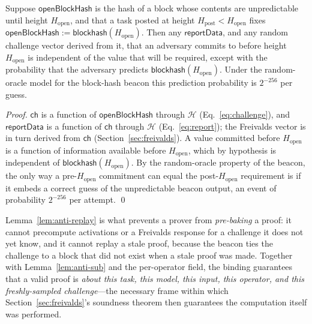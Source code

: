 \begin{lemma}
\label{lem:anti-replay}
Suppose $\mathsf{openBlockHash}$ is the hash of a block whose contents are
unpredictable until height $H_{\mathrm{open}}$, and that a task posted at height
$H_{\mathrm{post}} < H_{\mathrm{open}}$ fixes $\mathsf{openBlockHash} :=
\mathsf{blockhash}(H_{\mathrm{open}})$. Then any $\mathsf{reportData}$, and any
random challenge vector derived from it, that an adversary commits to before height
$H_{\mathrm{open}}$ is independent of the value that will be required, except with
the probability that the adversary predicts $\mathsf{blockhash}(H_{\mathrm{open}})$.
Under the random-oracle model for the block-hash beacon this prediction probability
is $2^{-256}$ per guess.
\end{lemma}

\begin{proof}
$\mathsf{ch}$ is a function of $\mathsf{openBlockHash}$ through $\mathcal{H}$
(Eq.~\ref{eq:challenge}), and $\mathsf{reportData}$ is a function of $\mathsf{ch}$
through $\mathcal{H}$ (Eq.~\ref{eq:report}); the Freivalds vector is in turn derived
from $\mathsf{ch}$ (Section~\ref{sec:freivalds}). A value committed before
$H_{\mathrm{open}}$ is a function of information available before
$H_{\mathrm{open}}$, which by hypothesis is independent of
$\mathsf{blockhash}(H_{\mathrm{open}})$. By the random-oracle property of the beacon,
the only way a pre-$H_{\mathrm{open}}$ commitment can equal the post-$H_{\mathrm{open}}$
requirement is if it embeds a correct guess of the unpredictable beacon output, an
event of probability $2^{-256}$ per attempt. \qed
\end{proof}

Lemma~\ref{lem:anti-replay} is what prevents a prover from \emph{pre-baking} a
proof: it cannot precompute activations or a Freivalds response for a challenge it
does not yet know, and it cannot replay a stale proof, because the beacon ties the
challenge to a block that did not exist when a stale proof was made. Together with
Lemma~\ref{lem:anti-sub} and the per-operator field, the binding guarantees that a
valid proof is \emph{about this task, this model, this input, this operator, and
this freshly-sampled challenge}---the necessary frame within which
Section~\ref{sec:freivalds}'s soundness theorem then guarantees the computation
itself was performed.
